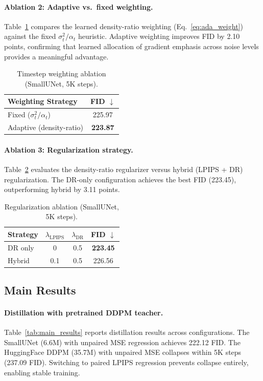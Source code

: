 \documentclass{article}
\theoremstyle{plain}
\theoremstyle{remark}
\begin{document}
\paragraph{Ablation 2: Adaptive vs.\ fixed weighting.}
Table~\ref{tab:weighting} compares the learned density-ratio weighting (Eq.~\ref{eq:ada_weight}) against the fixed $\sigma_t^2 / \alpha_t$ heuristic. Adaptive weighting improves FID by 2.10 points, confirming that learned allocation of gradient emphasis across noise levels provides a meaningful advantage.

\begin{table}[t]
\caption{Timestep weighting ablation (SmallUNet, 5K steps).}
\label{tab:weighting}
\centering
\begin{tabular}{lc}
\toprule
Weighting Strategy & FID $\downarrow$ \\
\midrule
Fixed ($\sigma_t^2 / \alpha_t$) & 225.97 \\
Adaptive (density-ratio) & \textbf{223.87} \\
\bottomrule
\end{tabular}
\end{table}

\paragraph{Ablation 3: Regularization strategy.}
Table~\ref{tab:regularization} evaluates the density-ratio regularizer versus hybrid (LPIPS + DR) regularization. The DR-only configuration achieves the best FID (223.45), outperforming hybrid by 3.11 points.

\begin{table}[t]
\caption{Regularization ablation (SmallUNet, 5K steps).}
\label{tab:regularization}
\centering
\begin{tabular}{lccc}
\toprule
Strategy & $\lambda_{\text{LPIPS}}$ & $\lambda_{\text{DR}}$ & FID $\downarrow$ \\
\midrule
DR only & 0 & 0.5 & \textbf{223.45} \\
Hybrid & 0.1 & 0.5 & 226.56 \\
\bottomrule
\end{tabular}
\end{table}

\subsection{Main Results}

\paragraph{Distillation with pretrained DDPM teacher.}
Table~\ref{tab:main_results} reports distillation results across configurations. The SmallUNet (6.6M) with unpaired MSE regression achieves 222.12 FID. The HuggingFace DDPM (35.7M) with unpaired MSE collapses within 5K steps (237.09 FID). Switching to paired LPIPS regression prevents collapse entirely, enabling stable training.
\end{document}
